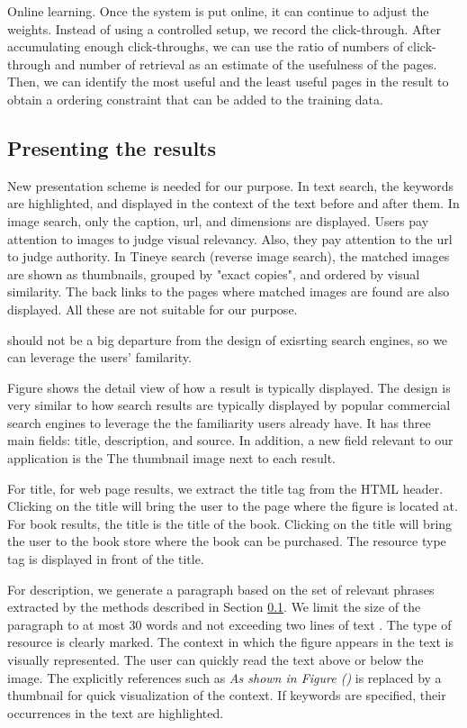 \documentclass{www2010-submission}
\begin{document}
Online learning. Once the system is put online, it can continue to
adjust the weights. Instead of using a controlled
setup, we record the click-through. After accumulating enough
click-throughs, we can use the ratio of numbers of click-through
and number of retrieval as an estimate of the usefulness of the
pages. Then, we can identify the most useful and the least useful
pages in the result to obtain a ordering constraint that can be
added to the training data.

\subsection{Presenting the results}

New presentation scheme is needed for our purpose. In text search,
the keywords are highlighted, and displayed in the context of the
text before and after them. In image search, only the caption,
url, and dimensions are displayed. Users pay attention to images
to judge visual relevancy. Also, they pay attention to the url to
judge authority. In Tineye search (reverse image search), the
matched images are shown as thumbnails, grouped by "exact copies",
and ordered by visual similarity. The back links to the pages
where matched images are found are also displayed. All these are
not suitable for our purpose.

should not be a big departure from the design of exisrting search
engines, so we can leverage the users' familarity.

Figure shows the detail view of how a result is typically
displayed. The design is very similar to how search results are
typically displayed by popular commercial search engines to
leverage the the familiarity users already have. It has three main
fields: title, description, and source. In
addition, a new field relevant to our application is the The
thumbnail image next to each result.

For title, for web page results, we extract the title tag from the
HTML header. Clicking on the title will bring the user to the page
where the figure is located at. For book results, the title is the
title of the book. Clicking on the title will bring the user to
the book store where the book can be purchased. The resource type
tag is displayed in front of the title.

For description, we generate a paragraph based on the set of
relevant phrases extracted by the methods described in Section
\ref{}. We limit the size of the paragraph to at most 30 words and
not exceeding two lines of text . The type of resource is clearly
marked. The context in which the figure appears in the text is
visually represented. The user can quickly read the text above or
below the image. The explicitly references such as \emph{As shown
in Figure ()} is replaced by a thumbnail for quick visualization
of the context. If keywords are specified, their occurrences in
the text are highlighted.
\end{document}
